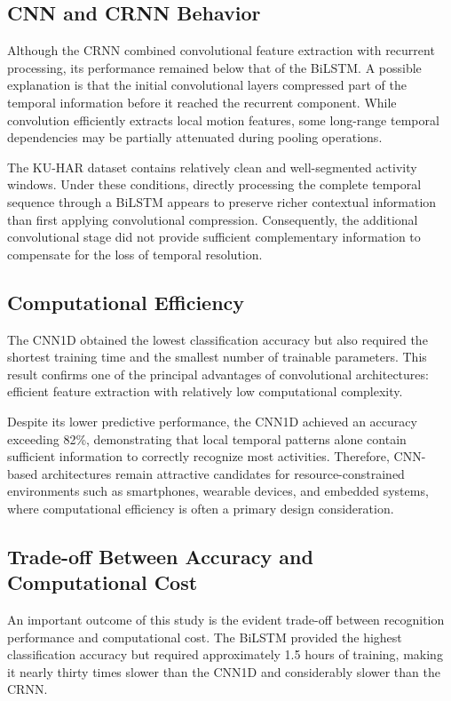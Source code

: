 \documentclass[journal]{IEEEtran}
\begin{document}
\subsection{CNN and CRNN Behavior}

Although the CRNN combined convolutional feature extraction with recurrent processing, its performance remained below that of the BiLSTM. A possible explanation is that the initial convolutional layers compressed part of the temporal information before it reached the recurrent component. While convolution efficiently extracts local motion features, some long-range temporal dependencies may be partially attenuated during pooling operations.

The KU-HAR dataset contains relatively clean and well-segmented activity windows. Under these conditions, directly processing the complete temporal sequence through a BiLSTM appears to preserve richer contextual information than first applying convolutional compression. Consequently, the additional convolutional stage did not provide sufficient complementary information to compensate for the loss of temporal resolution.

\subsection{Computational Efficiency}

The CNN1D obtained the lowest classification accuracy but also required the shortest training time and the smallest number of trainable parameters. This result confirms one of the principal advantages of convolutional architectures: efficient feature extraction with relatively low computational complexity.

Despite its lower predictive performance, the CNN1D achieved an accuracy exceeding 82\%, demonstrating that local temporal patterns alone contain sufficient information to correctly recognize most activities. Therefore, CNN-based architectures remain attractive candidates for resource-constrained environments such as smartphones, wearable devices, and embedded systems, where computational efficiency is often a primary design consideration.

\subsection{Trade-off Between Accuracy and Computational Cost}

An important outcome of this study is the evident trade-off between recognition performance and computational cost. The BiLSTM provided the highest classification accuracy but required approximately 1.5 hours of training, making it nearly thirty times slower than the CNN1D and considerably slower than the CRNN.
\end{document}
